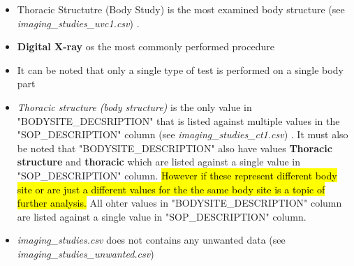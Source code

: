 \documentclass[12pt, twosided]{report}  %
\begin{document}
\begin{itemize}
	
	\item Thoracic Structutre (Body Study) is the most examined body structure (see \textit{imaging\_studies\_uvc1.csv}) .
	
	\item \textbf{Digital X-ray} os the most commonly performed procedure
	
	\item It can be noted that only a single type of test is performed on a single body part

	\item \textit{Thoracic structure (body structure)} is the only value in "BODYSITE\_DECSRIPTION" that is listed against multiple values in the "SOP\_DESCRIPTION" column (see \textit{imaging\_studies\_ct1.csv}) . It must also be noted that "BODYSITE\_DESCRIPTION" also have values \textbf{Thoracic structure} and \textbf{thoracic} which are listed against a single value in "SOP\_DESCRIPTION"  column. \hl{However if these represent different body site or are just a different values for the the same body site is a topic of further analysis.} All ohter values in "BODYSITE\_DESCRIPTION" column are listed against a single value in "SOP\_DESCRIPTION" column. 
	
	
	
	\item \textit{imaging\_studies.csv} does not contains any unwanted data (see \textit{imaging\_studies\_unwanted.csv})
	
\end{itemize}
\end{document}
